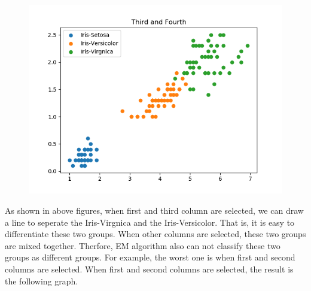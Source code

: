 \documentclass[a4paper]{article}
\begin{document}
\begin{figure}[h!]
\begin{minipage}[t]{6.5cm}
		\end{minipage}
		\hspace{2cm}
		\begin{minipage}[t]{6.5cm}
			\includegraphics[width=1.0\textwidth]{34.png}
		\end{minipage}
	\end{figure}

	As shown in above figures, when first and third column are selected, we can draw a line to seperate the Iris-Virgnica and the Iris-Versicolor. That is, it is easy to differentiate these two groups. When other columns are selected, these two groups are mixed together. Therfore, EM algorithm also can not classify these two groups as different groups. For example, the worst one is when first and second columns are selected. When first and second columns are selected, the result is the following graph.
\end{document}
